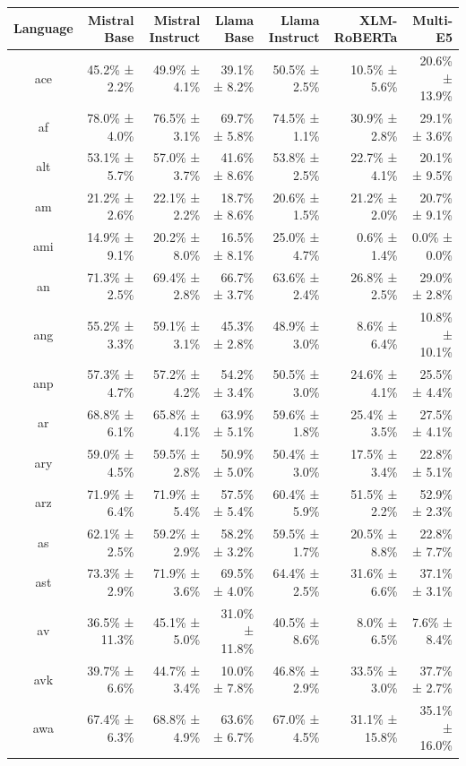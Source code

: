 \documentclass[10pt, a4paper]{article}
\begin{document}
\begin{table}[h]
\centering
\scriptsize
\begin{tabular}{crrrrrr}
\toprule
Language & Mistral Base & Mistral Instruct & Llama Base & Llama Instruct & XLM-RoBERTa & Multi-E5 \\
\midrule
ace & 45.2\% ± 2.2\% & 49.9\% ± 4.1\% & 39.1\% ± 8.2\% & 50.5\% ± 2.5\% & 10.5\% ± 5.6\% & 20.6\% ± 13.9\% \\
af & 78.0\% ± 4.0\% & 76.5\% ± 3.1\% & 69.7\% ± 5.8\% & 74.5\% ± 1.1\% & 30.9\% ± 2.8\% & 29.1\% ± 3.6\% \\
alt & 53.1\% ± 5.7\% & 57.0\% ± 3.7\% & 41.6\% ± 8.6\% & 53.8\% ± 2.5\% & 22.7\% ± 4.1\% & 20.1\% ± 9.5\% \\
am & 21.2\% ± 2.6\% & 22.1\% ± 2.2\% & 18.7\% ± 8.6\% & 20.6\% ± 1.5\% & 21.2\% ± 2.0\% & 20.7\% ± 9.1\% \\
ami & 14.9\% ± 9.1\% & 20.2\% ± 8.0\% & 16.5\% ± 8.1\% & 25.0\% ± 4.7\% & 0.6\% ± 1.4\% & 0.0\% ± 0.0\% \\
an & 71.3\% ± 2.5\% & 69.4\% ± 2.8\% & 66.7\% ± 3.7\% & 63.6\% ± 2.4\% & 26.8\% ± 2.5\% & 29.0\% ± 2.8\% \\
ang & 55.2\% ± 3.3\% & 59.1\% ± 3.1\% & 45.3\% ± 2.8\% & 48.9\% ± 3.0\% & 8.6\% ± 6.4\% & 10.8\% ± 10.1\% \\
anp & 57.3\% ± 4.7\% & 57.2\% ± 4.2\% & 54.2\% ± 3.4\% & 50.5\% ± 3.0\% & 24.6\% ± 4.1\% & 25.5\% ± 4.4\% \\
ar & 68.8\% ± 6.1\% & 65.8\% ± 4.1\% & 63.9\% ± 5.1\% & 59.6\% ± 1.8\% & 25.4\% ± 3.5\% & 27.5\% ± 4.1\% \\
ary & 59.0\% ± 4.5\% & 59.5\% ± 2.8\% & 50.9\% ± 5.0\% & 50.4\% ± 3.0\% & 17.5\% ± 3.4\% & 22.8\% ± 5.1\% \\
arz & 71.9\% ± 6.4\% & 71.9\% ± 5.4\% & 57.5\% ± 5.4\% & 60.4\% ± 5.9\% & 51.5\% ± 2.2\% & 52.9\% ± 2.3\% \\
as & 62.1\% ± 2.5\% & 59.2\% ± 2.9\% & 58.2\% ± 3.2\% & 59.5\% ± 1.7\% & 20.5\% ± 8.8\% & 22.8\% ± 7.7\% \\
ast & 73.3\% ± 2.9\% & 71.9\% ± 3.6\% & 69.5\% ± 4.0\% & 64.4\% ± 2.5\% & 31.6\% ± 6.6\% & 37.1\% ± 3.1\% \\
av & 36.5\% ± 11.3\% & 45.1\% ± 5.0\% & 31.0\% ± 11.8\% & 40.5\% ± 8.6\% & 8.0\% ± 6.5\% & 7.6\% ± 8.4\% \\
avk & 39.7\% ± 6.6\% & 44.7\% ± 3.4\% & 10.0\% ± 7.8\% & 46.8\% ± 2.9\% & 33.5\% ± 3.0\% & 37.7\% ± 2.7\% \\
awa & 67.4\% ± 6.3\% & 68.8\% ± 4.9\% & 63.6\% ± 6.7\% & 67.0\% ± 4.5\% & 31.1\% ± 15.8\% & 35.1\% ± 16.0\% \\

\end{tabular}
\end{table}
\end{document}
